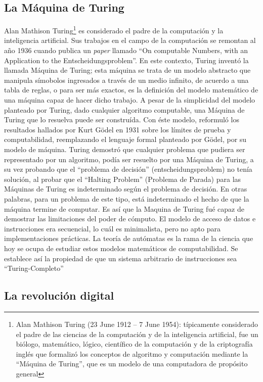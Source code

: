 \subsection{La Máquina de Turing}

Alan Mathison Turing\footnote{Alan Mathison Turing (23 June 1912 – 7 June 1954): típicamente considerado el padre de las ciencias de la computación y de la inteligencia artificial, fue un biólogo, matemático, lógico, científico de la computación y de la criptografía inglés que formalizó los conceptos de algoritmo y computación mediante la ``Máquina de Turing'', que es un modelo de una computadora de propósito general} es considerado el padre de la computación y la inteligencia artificial. Sus trabajos en el campo de la computación se remontan al año 1936 cuando publica un \emph{paper} llamado ``On computable Numbers, with an Application to the Entscheidungsproblem''. En este contexto, Turing inventó la llamada Máquina de Turing; esta máquina se trata de un modelo abstracto que manipula símobolos ingresados a través de un medio infinito, de acuerdo a una tabla de reglas, o para ser más exactos, es la definición del modelo matemático de una máquina capaz de hacer dicho trabajo. A pesar de la simplicidad del modelo planteado por Turing, dado cualquier algoritmo computable, una Máquina de Turing que lo resuelva puede ser construída. Con éste modelo, reformuló los resultados hallados por Kurt Gödel en 1931 sobre los límites de prueba y computabilidad, reemplazando el lenguaje formal planteado por Gödel, por su modelo de máquina. Turing demostró que cualquier problema que pudiera ser representado por un algoritmo, podía ser resuelto por una Máquina de Turing, a su vez probando que el ``problema de decisión'' (entscheidungsproblem) no tenía solución, al probar que el ``Halting Problem'' (Problema de Parada) para las Máquinas de Turing es indeterminado según el problema de decisión. En otras palabras, para un problema de este tipo, está indeterminado el hecho de que la máquina termine de computar. Es así que la Maquina de Turing fué capaz de demostrar las limitaciones del poder de cómputo. El modelo de acceso de datos e instrucciones era secuencial, lo cuál es minimalista, pero no apto para implementaciones prácticas. La teoría de autómatas es la rama de la ciencia que hoy se ocupa de estudiar estos modelos matemáticos de computabilidad. Se establece así la propiedad de que un sistema arbitrario de instrucciones sea ``Turing-Completo''

\subsection{La revolución digital}

